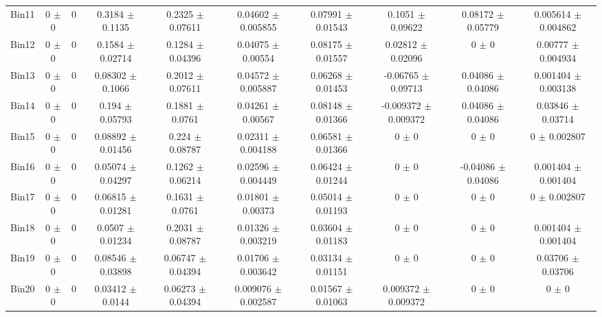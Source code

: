 \begin{tabular}{@{\extracolsep{4pt}}lccccccccc@{}}
     Bin11 & 0 $\pm$ 0 & 0 & 0.3184 $\pm$ 0.1135 & 0.2325 $\pm$ 0.07611 & 0.04602 $\pm$ 0.005855 & 0.07991 $\pm$ 0.01543 & 0.1051 $\pm$ 0.09622 & 0.08172 $\pm$ 0.05779 & 0.005614 $\pm$ 0.004862 \\ 
     Bin12 & 0 $\pm$ 0 & 0 & 0.1584 $\pm$ 0.02714 & 0.1284 $\pm$ 0.04396 & 0.04075 $\pm$ 0.00554 & 0.08175 $\pm$ 0.01557 & 0.02812 $\pm$ 0.02096 & 0 $\pm$ 0 & 0.00777 $\pm$ 0.004934 \\ 
     Bin13 & 0 $\pm$ 0 & 0 & 0.08302 $\pm$ 0.1066 & 0.2012 $\pm$ 0.07611 & 0.04572 $\pm$ 0.005887 & 0.06268 $\pm$ 0.01453 & -0.06765 $\pm$ 0.09713 & 0.04086 $\pm$ 0.04086 & 0.001404 $\pm$ 0.003138 \\ 
     Bin14 & 0 $\pm$ 0 & 0 & 0.194 $\pm$ 0.05793 & 0.1881 $\pm$ 0.0761 & 0.04261 $\pm$ 0.00567 & 0.08148 $\pm$ 0.01366 & -0.009372 $\pm$ 0.009372 & 0.04086 $\pm$ 0.04086 & 0.03846 $\pm$ 0.03714 \\ 
     Bin15 & 0 $\pm$ 0 & 0 & 0.08892 $\pm$ 0.01456 & 0.224 $\pm$ 0.08787 & 0.02311 $\pm$ 0.004188 & 0.06581 $\pm$ 0.01366 & 0 $\pm$ 0 & 0 $\pm$ 0 & 0 $\pm$ 0.002807 \\ 
     Bin16 & 0 $\pm$ 0 & 0 & 0.05074 $\pm$ 0.04297 & 0.1262 $\pm$ 0.06214 & 0.02596 $\pm$ 0.004449 & 0.06424 $\pm$ 0.01244 & 0 $\pm$ 0 & -0.04086 $\pm$ 0.04086 & 0.001404 $\pm$ 0.001404 \\ 
     Bin17 & 0 $\pm$ 0 & 0 & 0.06815 $\pm$ 0.01281 & 0.1631 $\pm$ 0.0761 & 0.01801 $\pm$ 0.00373 & 0.05014 $\pm$ 0.01193 & 0 $\pm$ 0 & 0 $\pm$ 0 & 0 $\pm$ 0.002807 \\ 
     Bin18 & 0 $\pm$ 0 & 0 & 0.0507 $\pm$ 0.01234 & 0.2031 $\pm$ 0.08787 & 0.01326 $\pm$ 0.003219 & 0.03604 $\pm$ 0.01183 & 0 $\pm$ 0 & 0 $\pm$ 0 & 0.001404 $\pm$ 0.001404 \\ 
     Bin19 & 0 $\pm$ 0 & 0 & 0.08546 $\pm$ 0.03898 & 0.06747 $\pm$ 0.04394 & 0.01706 $\pm$ 0.003642 & 0.03134 $\pm$ 0.01151 & 0 $\pm$ 0 & 0 $\pm$ 0 & 0.03706 $\pm$ 0.03706 \\ 
     Bin20 & 0 $\pm$ 0 & 0 & 0.03412 $\pm$ 0.0144 & 0.06273 $\pm$ 0.04394 & 0.009076 $\pm$ 0.002587 & 0.01567 $\pm$ 0.01063 & 0.009372 $\pm$ 0.009372 & 0 $\pm$ 0 & 0 $\pm$ 0 \\ 
\hline\hline
  \end{tabular}
